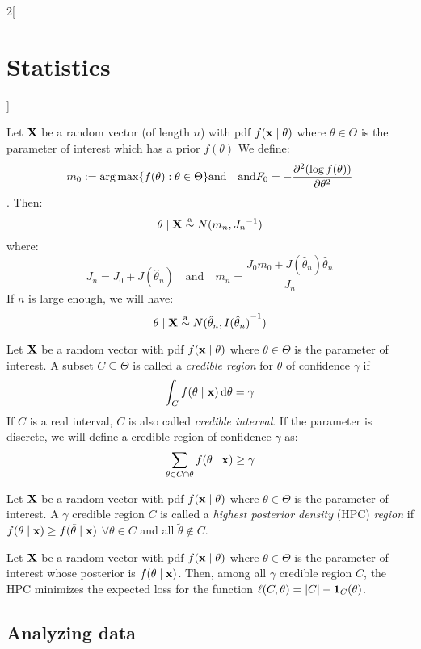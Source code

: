 \documentclass[../../../main.tex]{subfiles}
\begin{document}
\begin{multicols}{2}[\section{Statistics}]
  \begin{theorem}
    Let $\boldsymbol{\mathrm{X}}$ be a random vector (of length $n$) with pdf $f(\boldsymbol{\mathrm{x}}\mid \theta)$ where $\theta\in\Theta$ is the parameter of interest which has a prior $f(\theta)$ We define: $$m_0:=\operatorname*{arg\,max}\{f(\theta):\theta\in\Theta\}\text{and}\quad\text{and} F_0=-\pdv[2]{(\log f(\theta))}{\theta}(m_0)$$. Then: $$\theta\mid\boldsymbol{\mathrm{X}}\overset{\text{a}}{\sim} N(m_n,{J_n}^{-1})$$
    where: $$J_n=J_0+J(\hat\theta_n)\quad\text{and}\quad m_n=\frac{J_0m_0+J(\hat\theta_n)\hat\theta_n}{J_n}$$
    If $n$ is large enough, we will have: $$\theta\mid\boldsymbol{\mathrm{X}}\overset{\text{a}}{\sim} N(\hat\theta_n,{I(\hat\theta_n)}^{-1})$$
  \end{theorem}
  \begin{definition}
    Let $\boldsymbol{\mathrm{X}}$ be a random vector with pdf $f(\boldsymbol{\mathrm{x}}\mid \theta)$ where $\theta\in\Theta$ is the parameter of interest. A subset $C\subseteq \Theta$ is called a \emph{credible region} for $\theta$ of confidence $\gamma$ if $$\int_Cf(\theta\mid\boldsymbol{\mathrm{x}})\dd{\theta}=\gamma$$ If $C$ is a real interval, $C$ is also called \emph{credible interval}. If the parameter is discrete, we will define a credible region of confidence $\gamma$ as: $$\sum_{\theta\in C\cap \theta}f(\theta\mid\boldsymbol{\mathrm{x}})\geq \gamma$$
  \end{definition}
  \begin{definition}
    Let $\boldsymbol{\mathrm{X}}$ be a random vector with pdf $f(\boldsymbol{\mathrm{x}}\mid \theta)$ where $\theta\in\Theta$ is the parameter of interest. A $\gamma$ credible region $C$ is called a \emph{highest posterior density} (HPC) \emph{region} if $f(\theta\mid\boldsymbol{\mathrm{x}})\geq f(\tilde{\theta}\mid \boldsymbol{\mathrm{x}})$ $\forall \theta\in C$ and all $\tilde{\theta}\notin C$.
  \end{definition}
  \begin{proposition}
    Let $\boldsymbol{\mathrm{X}}$ be a random vector with pdf $f(\boldsymbol{\mathrm{x}}\mid \theta)$ where $\theta\in\Theta$ is the parameter of interest whose posterior is $f(\theta\mid\boldsymbol{\mathrm{x}})$. Then, among all $\gamma$ credible region $C$, the HPC minimizes the expected loss for the function $\ell(C,\theta)=\abs{C}-\boldsymbol{\mathrm{1}}_{C}(\theta)$.
  \end{proposition}
  \subsection{Analyzing data}

\end{multicols}
\end{document}
